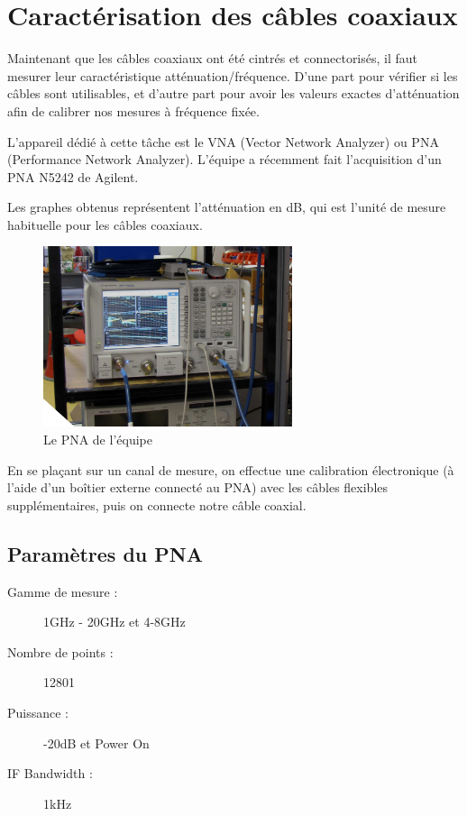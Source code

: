 \chapter{Caractérisation des câbles coaxiaux}

Maintenant que les câbles coaxiaux ont été cintrés et connectorisés, il faut mesurer leur caractéristique atténuation/fréquence. D'une part pour vérifier si les câbles sont utilisables, et d'autre part pour avoir les valeurs exactes d'atténuation afin de calibrer nos mesures à fréquence fixée.

L'appareil dédié à cette tâche est le VNA (Vector Network Analyzer) ou PNA (Performance Network Analyzer). L'équipe a récemment fait l'acquisition d'un PNA N5242 de Agilent.

Les graphes obtenus représentent l'atténuation en dB, qui est l'unité de mesure habituelle pour les câbles coaxiaux.
\begin{figure}[h]
    \begin{center}
        \includegraphics[width=0.65\textwidth]{Images/VNA}
        \caption{Le PNA de l'équipe}
        \label{PNA}
    \end{center}
\end{figure}

En se plaçant sur un canal de mesure, on effectue une calibration électronique (à l'aide d'un boîtier externe connecté au PNA) avec les câbles flexibles supplémentaires, puis on connecte notre câble coaxial.

\newpage
\section{Paramètres du PNA}
\begin{description}
    \item[Gamme de mesure :] 1GHz - 20GHz et 4-8GHz
    \item[Nombre de points :] 12801
    \item[Puissance :] -20dB et Power On
    \item[IF Bandwidth :] 1kHz
\end{description}

